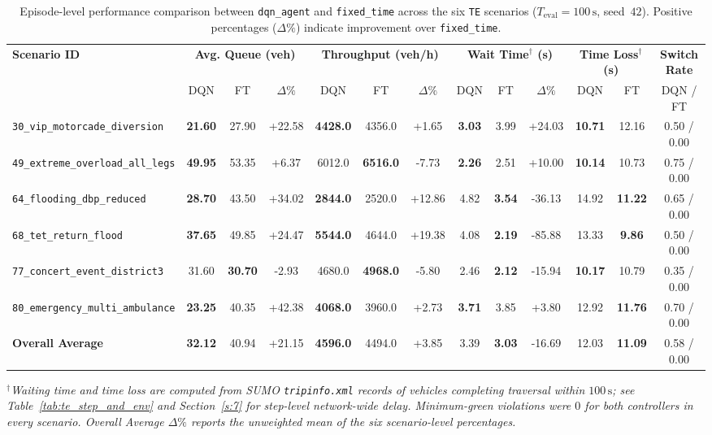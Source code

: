\begin{table}[t]
\caption{Episode-level performance comparison between \texttt{dqn\_agent} and \texttt{fixed\_time} across the six \texttt{TE} scenarios ($T_{\text{eval}}=100\,\mathrm{s}$, seed~$42$). Positive percentages ($\Delta\%$) indicate improvement over \texttt{fixed\_time}.}
\label{tab:te_primary_results}
\centering
\scriptsize
\begin{tabular}{lcccccccccccc}
\toprule
\textbf{Scenario ID} & \multicolumn{3}{c}{\textbf{Avg. Queue (veh)}} & \multicolumn{3}{c}{\textbf{Throughput (veh/h)}} & \multicolumn{3}{c}{\textbf{Wait Time$^\dagger$ (s)}} & \multicolumn{2}{c}{\textbf{Time Loss$^\dagger$ (s)}} & \textbf{Switch Rate} \\
\cmidrule(lr){2-4}\cmidrule(lr){5-7}\cmidrule(lr){8-10}\cmidrule(lr){11-12}\cmidrule(lr){13-13}
 & DQN & FT & $\Delta\%$ & DQN & FT & $\Delta\%$ & DQN & FT & $\Delta\%$ & DQN & FT & DQN / FT \\
\midrule
\texttt{30\_vip\_motorcade\_diversion}  & \textbf{21.60} & 27.90 & +22.58 & \textbf{4428.0} & 4356.0 & +1.65  & \textbf{3.03} & 3.99 & +24.03 & \textbf{10.71} & 12.16 & 0.50 / 0.00 \\
\texttt{49\_extreme\_overload\_all\_legs}& \textbf{49.95} & 53.35 & +6.37  & 6012.0 & \textbf{6516.0} & -7.73  & \textbf{2.26} & 2.51 & +10.00 & \textbf{10.14} & 10.73 & 0.75 / 0.00 \\
\texttt{64\_flooding\_dbp\_reduced}     & \textbf{28.70} & 43.50 & +34.02 & \textbf{2844.0} & 2520.0 & +12.86 & 4.82 & \textbf{3.54} & -36.13 & 14.92 & \textbf{11.22} & 0.65 / 0.00 \\
\texttt{68\_tet\_return\_flood}         & \textbf{37.65} & 49.85 & +24.47 & \textbf{5544.0} & 4644.0 & +19.38 & 4.08 & \textbf{2.19} & -85.88 & 13.33 & \textbf{9.86}  & 0.50 / 0.00 \\
\texttt{77\_concert\_event\_district3}  & 31.60 & \textbf{30.70} & -2.93  & 4680.0 & \textbf{4968.0} & -5.80  & 2.46 & \textbf{2.12} & -15.94 & \textbf{10.17} & 10.79 & 0.35 / 0.00 \\
\texttt{80\_emergency\_multi\_ambulance}& \textbf{23.25} & 40.35 & +42.38 & \textbf{4068.0} & 3960.0 & +2.73  & \textbf{3.71} & 3.85 & +3.80  & 12.92 & \textbf{11.76} & 0.70 / 0.00 \\
\midrule
\textbf{Overall Average}                & \textbf{32.12} & 40.94 & +21.15 & \textbf{4596.0} & 4494.0 & +3.85  & 3.39 & \textbf{3.03} & -16.69 & 12.03 & \textbf{11.09} & 0.58 / 0.00 \\
\bottomrule
\end{tabular}
\begin{minipage}{\textwidth}
\vspace{2pt}
\footnotesize
\textit{$^\dagger$Waiting time and time loss are computed from SUMO \texttt{tripinfo.xml} records of vehicles completing traversal within $100\,\mathrm{s}$; see Table~\ref{tab:te_step_and_env} and Section~\ref{s:7} for step-level network-wide delay. Minimum-green violations were $0$ for both controllers in every scenario. Overall Average $\Delta\%$ reports the unweighted mean of the six scenario-level percentages.}
\end{minipage}
\end{table}

